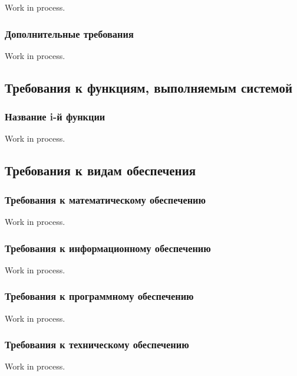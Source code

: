 Work in process.

\subsubsection{Дополнительные требования}

Work in process.

\subsection{Требования к функциям, выполняемым системой}

\subsubsection{Название i-й функции}

Work in process.

\subsection{Требования к видам обеспечения}

\subsubsection{Требования к математическому обеспечению}

Work in process.

\subsubsection{Требования к информационному обеспечению}

Work in process.

\subsubsection{Требования к программному обеспечению}

Work in process.

\subsubsection{Требования к техническому обеспечению}

Work in process.

\clearpage
\newpage